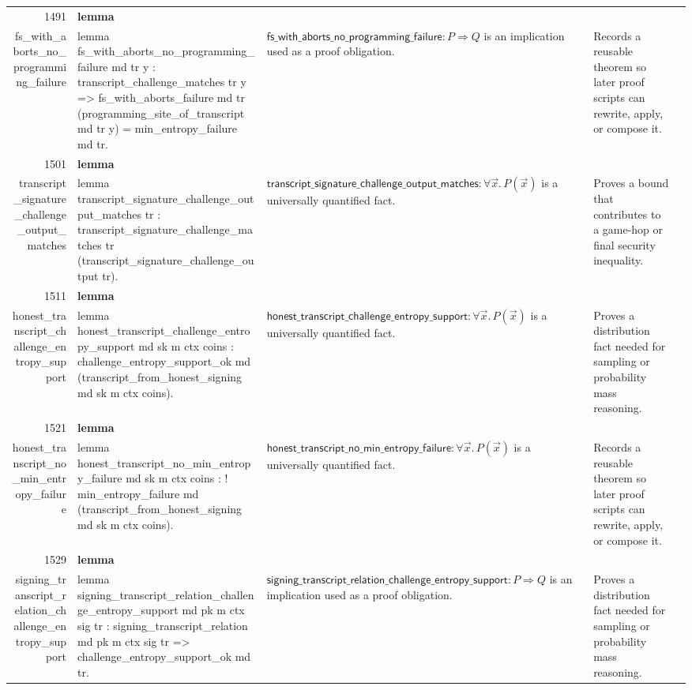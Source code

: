 \documentclass[10pt]{article}
\newcommand{\ec}[1]{\begingroup\ttfamily\scriptsize #1\endgroup}
\begin{document}
\begin{longtable}{r L{0.17\textwidth} L{0.26\textwidth} L{0.27\textwidth} L{0.20\textwidth}}
1491 & \textbf{lemma}\\\ec{fs\_with\_aborts\_no\_programming\_failure} & \ec{lemma fs\_with\_aborts\_no\_programming\_failure md tr y : transcript\_challenge\_matches tr y => fs\_with\_aborts\_failure md tr (programming\_site\_of\_transcript md tr y) = min\_entropy\_failure md tr.} & \(\mathsf{fs\_with\_aborts\_no\_programming\_failure} : P \Rightarrow Q\) is an implication used as a proof obligation. & Records a reusable theorem so later proof scripts can rewrite, apply, or compose it. \\
1501 & \textbf{lemma}\\\ec{transcript\_signature\_challenge\_output\_matches} & \ec{lemma transcript\_signature\_challenge\_output\_matches tr : transcript\_signature\_challenge\_matches tr (transcript\_signature\_challenge\_output tr).} & \(\mathsf{transcript\_signature\_challenge\_output\_matches} : \forall \vec{x}.\, P(\vec{x})\) is a universally quantified fact. & Proves a bound that contributes to a game-hop or final security inequality. \\
1511 & \textbf{lemma}\\\ec{honest\_transcript\_challenge\_entropy\_support} & \ec{lemma honest\_transcript\_challenge\_entropy\_support md sk m ctx coins : challenge\_entropy\_support\_ok md (transcript\_from\_honest\_signing md sk m ctx coins).} & \(\mathsf{honest\_transcript\_challenge\_entropy\_support} : \forall \vec{x}.\, P(\vec{x})\) is a universally quantified fact. & Proves a distribution fact needed for sampling or probability mass reasoning. \\
1521 & \textbf{lemma}\\\ec{honest\_transcript\_no\_min\_entropy\_failure} & \ec{lemma honest\_transcript\_no\_min\_entropy\_failure md sk m ctx coins : ! min\_entropy\_failure md (transcript\_from\_honest\_signing md sk m ctx coins).} & \(\mathsf{honest\_transcript\_no\_min\_entropy\_failure} : \forall \vec{x}.\, P(\vec{x})\) is a universally quantified fact. & Records a reusable theorem so later proof scripts can rewrite, apply, or compose it. \\
1529 & \textbf{lemma}\\\ec{signing\_transcript\_relation\_challenge\_entropy\_support} & \ec{lemma signing\_transcript\_relation\_challenge\_entropy\_support md pk m ctx sig tr : signing\_transcript\_relation md pk m ctx sig tr => challenge\_entropy\_support\_ok md tr.} & \(\mathsf{signing\_transcript\_relation\_challenge\_entropy\_support} : P \Rightarrow Q\) is an implication used as a proof obligation. & Proves a distribution fact needed for sampling or probability mass reasoning. \\

\end{longtable}
\end{document}
